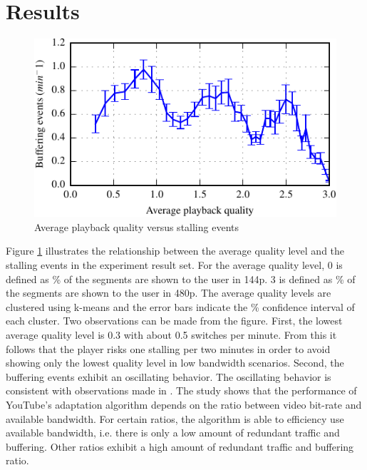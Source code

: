 
\section{Results}
\label{sec:results}

\begin{figure}[t]
\centering
\includegraphics[width=0.95\linewidth]{figs/33qualityvstalling}%
\caption{Average playback quality versus stalling events}
\label{fig:qualityvsstalling}%
\end{figure}

Figure \ref{fig:qualityvsstalling} illustrates the relationship between the average quality level and the stalling events in the experiment result set.
For the average quality level, 0 is defined as \unit[100]{\%} of the segments are shown to the user in 144p. 3 is defined as \unit[100]{\%} of the segments are shown to the user in 480p.
The average quality levels are clustered using k-means and the error bars indicate the \unit[95]{\%} confidence interval of each cluster.
Two observations can be made from the figure. 
First, the lowest average quality level is 0.3 with about 0.5 switches per minute.
From this it follows that the player risks one stalling per two minutes in order to avoid showing only the lowest quality level in low bandwidth scenarios.
Second, the buffering events exhibit an oscillating behavior.
The oscillating behavior is consistent with observations made in \cite{sieber16sacrificing}.
The study shows that the performance of YouTube's adaptation algorithm depends on the ratio between video bit-rate and available bandwidth.
For certain ratios, the algorithm is able to efficiency use available bandwidth, i.e. there is only a low amount of redundant traffic and buffering.
Other ratios exhibit a high amount of redundant traffic and buffering ratio.

